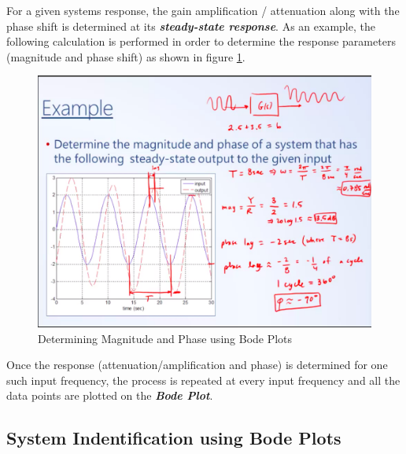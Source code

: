 For a given systems response, the gain amplification / attenuation along with the phase shift is determined at its \textbf{\textit{steady-state response}}. As an example, the following calculation is performed in order to determine the response parameters (magnitude and phase shift) as shown in figure \ref{Fig_FrequencyResp_ExampleProb}.
\begin{figure}[h!]
	\centering
	\includegraphics[width=\linewidth]{Bilder/FrequencyResp_ExampleProb}
	\caption{Determining Magnitude and Phase using Bode Plots}
	\label{Fig_FrequencyResp_ExampleProb}
\end{figure}

Once the response (attenuation/amplification and phase) is determined for one such input frequency, the process is repeated at every input frequency and all the data points are plotted on the \textbf{\textit{Bode Plot}}. 

\subsection{System Indentification using Bode Plots}

